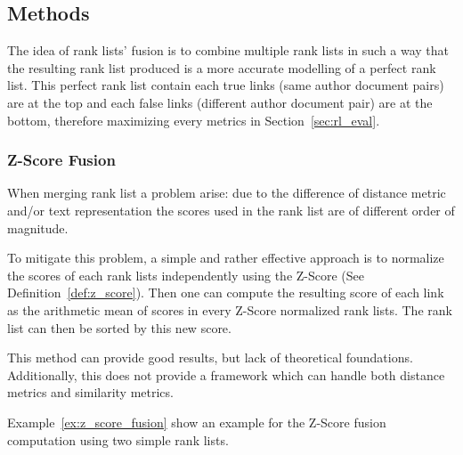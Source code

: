 \subsection{Methods \label{sec:rank_lists_fusion}}


The idea of rank lists' fusion is to combine multiple rank lists in such a way that the resulting rank list produced is a more accurate modelling of a perfect rank list.
This perfect rank list contain each true links (same author document pairs) are at the top and each false links (different author document pair) are at the bottom, therefore maximizing every metrics in Section~\ref{sec:rl_eval}.

\subsubsection{Z-Score Fusion}

When merging rank list a problem arise: due to the difference of distance metric and/or text representation the scores used in the rank list are of different order of magnitude.

To mitigate this problem, a simple and rather effective approach is to normalize the scores of each rank lists independently using the Z-Score (See Definition~\ref{def:z_score}).
Then one can compute the resulting score of each link as the arithmetic mean of scores in every Z-Score normalized rank lists.
The rank list can then be sorted by this new score.

This method can provide good results, but lack of theoretical foundations.
Additionally, this does not provide a framework which can handle both distance metrics and similarity metrics.

Example~\ref{ex:z_score_fusion} show an example for the Z-Score fusion computation using two simple rank lists.

